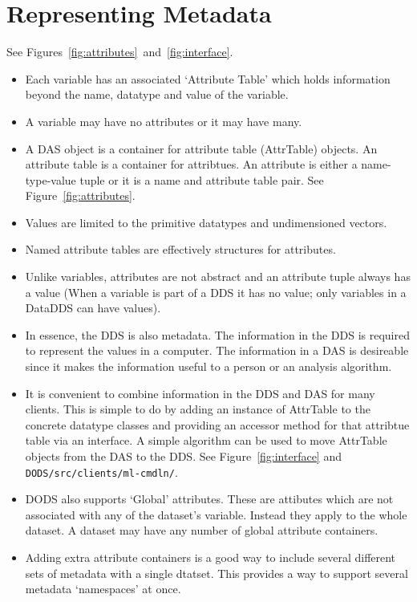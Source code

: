 \documentclass{article}
\begin{document}
\section{Representing Metadata}
\label{sec:metadata}

See Figures~\ref{fig:attributes}~and~\ref{fig:interface}.

\begin{itemize}
\item Each variable has an associated `Attribute Table' which holds
  information beyond the name, datatype and value of the variable.
  
\item A variable may have no attributes or it may have many.
  
\item A DAS object is a container for attribute table (AttrTable) objects. An
  attribute table is a container for attribtues. An attribute is either a
  name-type-value tuple or it is a name and attribute table pair. See
  Figure~\ref{fig:attributes}.
  
\item Values are limited to the primitive datatypes and undimensioned
  vectors.
  
\item Named attribute tables are effectively structures for attributes.
  
\item Unlike variables, attributes are not abstract and an attribute tuple
  always has a value (When a variable is part of a DDS it has no value; only
  variables in a DataDDS can have values).
  
\item In essence, the DDS is also metadata. The information in the DDS is
  required to represent the values in a computer. The information in a DAS is
  desireable since it makes the information useful to a person or an analysis
  algorithm.
  
\item It is convenient to combine information in the DDS and DAS for many
  clients.  This is simple to do by adding an instance of AttrTable to the
  concrete datatype classes and providing an accessor method for that
  attribtue table via an interface. A simple algorithm can be used to move
  AttrTable objects from the DAS to the DDS. See Figure~\ref{fig:interface}
  and \texttt{DODS/\-src/\-clients/\-ml-cmdln/}.

\item DODS also supports `Global' attributes. These are attibutes which are
  not associated with any of the dataset's variable. Instead they apply to
  the whole dataset. A dataset may have any number of global attribute
  containers.

\item Adding extra attribute containers is a good way to include several
  different sets of metadata with a single dtatset. This provides a way to
  support several metadata `namespaces' at once.
\end{itemize}
\end{document}
